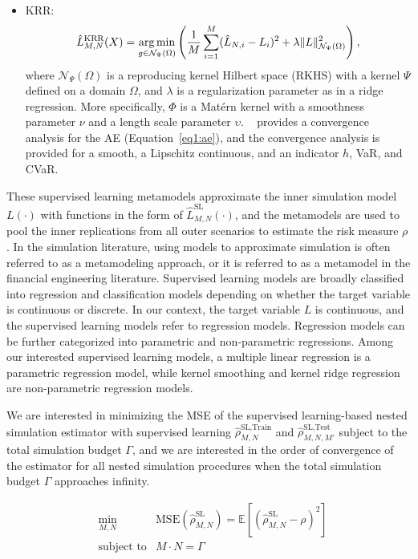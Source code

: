\begin{itemize}
    \item   KRR:
            $$\hat{L}^{\text{KRR}}_{M, N}(X) = \operatorname*{arg\,min}_{g \in \mathcal{N}_{\Psi}(\Omega)} \left( \frac{1}{M} \sum_{i=1}^M (\hat{L}_{N, i} - L_i)^2 + \lambda \|L\|_{\mathcal{N}_{\Psi}(\Omega)}^2\right),$$
            where $\mathcal{N}_{\Psi}(\Omega)$ is a reproducing kernel Hilbert space (RKHS) with a kernel $\Psi$ defined on a domain $\Omega$, and $\lambda$ is a regularization parameter as in a ridge regression. 
            More specifically, $\Phi$ is a Mat\'ern kernel with a smoothness parameter $\nu$ and a length scale parameter $\upsilon$.
            ~\cite{wang2022smooth} provides a convergence analysis for the AE (Equation~\ref{eq1:ae}), and the convergence analysis is provided for a smooth, a Lipschitz continuous, and an indicator $h$, VaR, and CVaR.
\end{itemize}

These supervised learning metamodels approximate the inner simulation model $L(\cdot)$ with functions in the form of $\hat{L}^{\text{SL}}_{M, N}(\cdot)$, and the metamodels are used to pool the inner replications from all outer scenarios to estimate the risk measure $\rho$.
In the simulation literature, using models to approximate simulation is often referred to as a metamodeling approach, or it is referred to as a metamodel in the financial engineering literature.
Supervised learning models are broadly classified into regression and classification models depending on whether the target variable is continuous or discrete.
In our context, the target variable $L$ is continuous, and the supervised learning models refer to regression models.
Regression models can be further categorized into parametric and non-parametric regressions.
Among our interested supervised learning models, a multiple linear regression is a parametric regression model, while kernel smoothing and kernel ridge regression are non-parametric regression models.

We are interested in minimizing the MSE of the supervised learning-based nested simulation estimator with supervised learning $\hat{\rho}^{\text{SL}, \text{Train}}_{M, N}$ and $\hat{\rho}^{\text{SL}, \text{Test}}_{M, N, M'}$ subject to the total simulation budget $\Gamma$, and we are interested in the order of convergence of the estimator for all nested simulation procedures when the total simulation budget $\Gamma$ approaches infinity.

\begin{align}
    & \min_{M, N}  & \text{MSE}(\hat{\rho}^{\text{SL}}_{M, N}) = \mathbb{E} \left[ \left( \hat{\rho}^{\text{SL}}_{M, N} - \rho \right)^2 \right] \nonumber \\
    & \text{subject to} & M \cdot N = \Gamma 
\end{align}

